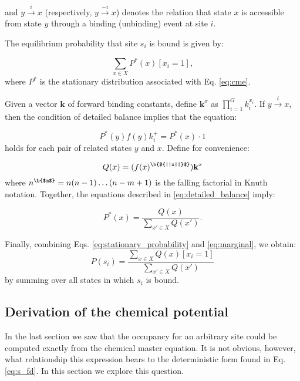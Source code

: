 \documentclass{article}
\begin{document}
and $y \overset{i}{\rightarrow} x$ (respectively, $y
\overset{-i}{\rightarrow} x$) denotes the relation that state $x$
is accessible from state $y$ through a binding (unbinding) event at
site $i$.  

The equilibrium probability that site $s_i$ is bound is given by:

\begin{equation}
\label{eq:marginal}
 \sum_{x\in X}P^*(x)[x_i = 1],
\end{equation}
where $P^*$ is the stationary distribution associated with Eq. \ref{eq:cme}.  

Given a vector $\mathbf{k}$ of forward binding constants, define
$\mathbf{k}^x$ as $\prod_{i=1}^Gk_i^{x_i}$.  If
$y\overset{i}\rightarrow x$, then the condition of detailed balance
implies that the equation:

\begin{equation}
\label{eq:detailed_balance}
P^*(y) f(y)k^+_i = P^*(x)\cdot 1
\end{equation}
holds for each pair of related states $y$ and $x$.  Define for convenience:

\begin{equation}
  \label{eq:q}
  Q(x) = (f(x)^{\b{${||x||}$}})\mathbf{k}^x
\end{equation}
where $n^{\b{$m$}} = n(n-1)\ldots(n-m+1)$ is the falling factorial in Knuth notation.
Together, the equations described in \ref{eq:detailed_balance} imply:

\begin{equation}
  \label{eq:stationary_probability}
  P^*(x)=\frac{Q(x)}{\sum_{x'\in X}Q(x')}.
\end{equation}

Finally, combining Eqs. \ref{eq:stationary_probability}
and \ref{eq:marginal}, we obtain:
\begin{equation}
  \label{eq:stochastic_occupancy}
  P(s_i) = \frac{\sum_{x\in X}Q(x)[x_i = 1]}{\sum_{x'\in X}Q(x')}
\end{equation}
by summing over all states in which $s_i$ is bound.


\subsection{Derivation of the chemical potential}

In the last section we saw that the occupancy for an arbitrary site
could be computed exactly from the chemical master equation.  It is
not obvious, however, what relationship this expression bears to the
deterministic form found in Eq. \ref{eq:s_fd}.  In this section we
explore this question.
\end{document}
